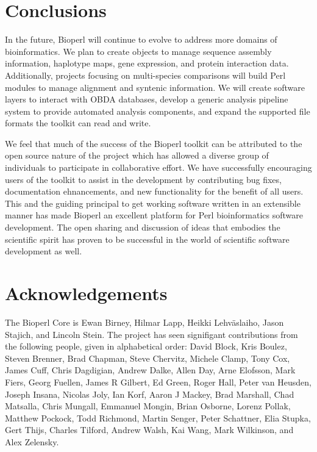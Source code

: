 \documentclass[12pt]{article}
\begin{document}
\section{Conclusions}

In the future, Bioperl will continue to evolve to address more domains
of bioinformatics.  We plan to create objects to manage sequence
assembly information, haplotype maps, gene expression, and protein
interaction data.  Additionally, projects focusing on multi-species
comparisons will build Perl modules to manage alignment and syntenic
information.  We will create software layers to interact with OBDA
databases, develop a generic analysis pipeline system to provide
automated analysis components, and expand the supported file formats
the toolkit can read and write.

We feel that much of the success of the Bioperl toolkit can be
attributed to the open source nature of the project which has allowed
a diverse group of individuals to participate in collaborative effort.
We have successfully encouraging users of the toolkit to assist in the
development by contributing bug fixes, documentation ehnancements, and
new functionality for the benefit of all users. This and the guiding
principal to get working software written in an extensible manner has
made Bioperl an excellent platform for Perl bioinformatics software
development.  The open sharing and discussion of ideas that embodies
the scientific spirit has proven to be successful in the world of
scientific software development as well.

\section{Acknowledgements}

The Bioperl Core is Ewan Birney, Hilmar Lapp, Heikki Lehv\"{a}slaiho,
Jason Stajich, and Lincoln Stein.  The project has seen signifigant
contributions from the following people, given in alphabetical order:
David Block, Kris Boulez, Steven Brenner, Brad Chapman, Steve
Chervitz, Michele Clamp, Tony Cox, James Cuff, Chris Dagdigian, Andrew
Dalke, Allen Day, Arne Elofsson, Mark Fiers, Georg Fuellen, James R
Gilbert, Ed Green, Roger Hall, Peter van Heusden, Joseph Insana,
Nicolas Joly, Ian Korf, Aaron J Mackey, Brad Marshall, Chad Matsalla,
Chris Mungall, Emmanuel Mongin, Brian Osborne, Lorenz Pollak, Matthew
Pockock, Todd Richmond, Martin Senger, Peter Schattner, Elia Stupka,
Gert Thijs, Charles Tilford, Andrew Walsh, Kai Wang, Mark Wilkinson,
and Alex Zelensky.
\end{document}
